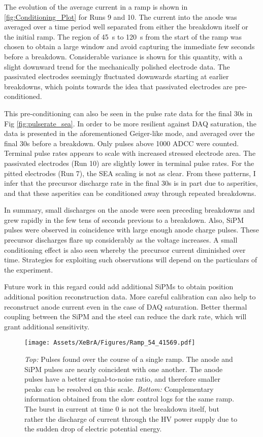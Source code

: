 The evolution of the average current in a ramp is shown in  \ref{fig:Conditioning_Plot} for Runs 9 and 10.
The current into the anode was averaged over a time period well separated from either the breakdown itself or the initial ramp.
The region of 45~s to 120~s from the start of the ramp was chosen to obtain a large window and avoid capturing the immediate few seconds before a breakdown.
Considerable variance is shown for this quantity, with a slight downward trend for the mechanically polished electrode data.
The passivated electrodes seemingly fluctuated downwards starting at earlier breakdowns, which points towards the idea that passivated electrodes are pre-conditioned.

This pre-conditioning can also be seen in the pulse rate data for the final 30s in Fig \ref{fig:pulserate_sea}.
In order to be more resilient against DAQ saturation, the data is presented in the aforementioned Geiger-like mode, and averaged over the final 30s before a breakdown.
Only pulses above 1000 ADCC were counted.
Terminal pulse rates appears to scale with increased stressed electrode area.
The passivated electrodes (Run 10) are slightly lower in terminal pulse rates.
For the pitted electrodes (Run 7), the SEA scaling is not as clear.
From these patterns, I infer that the precursor discharge rate in the  final 30s is in part due to asperities, and that these asperities can be conditioned away through repeated breakdowns.


In summary, small discharges on the anode were seen preceding breakdowns and grew rapidly in the few tens of seconds previous to a breakdown.
Also, SiPM pulses were observed in coincidence with large enough anode charge pulses.  
These precursor discharges flare up considerably as the voltage increases.
A small conditioning effect is also seen whereby the precursor current diminished over time.
Strategies for exploiting such observations will depend on the particulars of the experiment.


Future work in this regard could add additional SiPMs to obtain position additional position reconstruction data.
More careful calibration can also help to reconstruct anode current even in the case of DAQ saturation.
Better thermal coupling between the SiPM and the steel can reduce the dark rate, which will grant additional sensitivity.
\begin{figure}
    \centering
    \texttt{[image: Assets/XeBrA/Figures/Ramp\_54\_41569.pdf]}
    \caption[Pulse rate evolution over the courase of a single ramp.]%
    {
    \emph{Top:} Pulses found over the course of a single ramp.
    The anode and SiPM pulses are nearly coincident with one another. 
    The anode pulses have a better signal-to-noise ratio, and therefore smaller peaks can be resolved on this scale.
    \emph{Bottom:} Complementary information obtained from the slow control logs for the same ramp. 
    The burst in current at time 0 is not the breakdown itself, but rather the discharge of current through the HV power supply due to the sudden drop of electric potential energy.
    }
    \label{fig:breakdown}
\end{figure}

